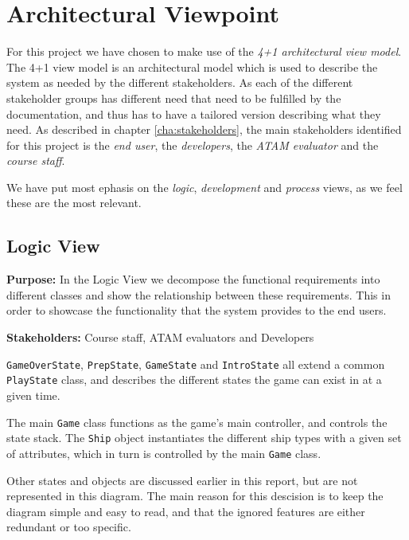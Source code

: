 \chapter{Architectural Viewpoint}
\label{cha:architectural_viewpoint}
For this project we have chosen to make use of the \emph{4+1 architectural view model}. The 4+1 view model is an architectural model which is used to describe the system as needed by the different stakeholders. As each of the different stakeholder groups has different need that need to be fulfilled by the documentation, and thus has to have a tailored version describing what they need. As described in chapter \ref{cha:stakeholders}, the main stakeholders identified for this project is the \emph{end user}, the \emph{developers}, the \emph{ATAM evaluator} and the \emph{course staff}.


We have put most ephasis on the \emph{logic}, \emph{development} and \emph{process} views, as we feel these are the most relevant.


    \section{Logic View}
    \textbf{Purpose:} In the Logic View we decompose the functional requirements into different classes and show the relationship between these requirements. This in order to showcase the functionality that the system provides to the end users.    
    
    \noindent\textbf{Stakeholders:} Course staff, ATAM evaluators and Developers 
    
    

    \texttt{GameOverState}, \texttt{PrepState}, \texttt{GameState} and \texttt{IntroState} all extend a common \texttt{PlayState} class, and describes the different states the game can exist in at a given time.

    The main \texttt{Game} class functions as the game's main controller, and controls the state stack. The \texttt{Ship} object instantiates the different ship types with a given set of attributes, which in turn is controlled by the main \texttt{Game} class.

    Other states and objects are discussed earlier in this report, but are not represented in this diagram. The main reason for this descision is to keep the diagram simple and easy to read, and that the ignored features are either redundant or too specific.



